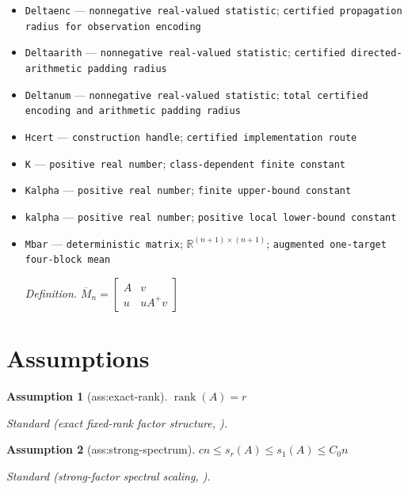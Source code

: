 \documentclass{article}
\newtheorem{assumption}{Assumption}
\begin{document}
\begin{itemize}
  \item \texttt{Deltaenc} --- \texttt{nonnegative real-\allowbreak{}valued statistic}; \texttt{certified propagation radius for observation encoding}
  \item \texttt{Deltaarith} --- \texttt{nonnegative real-\allowbreak{}valued statistic}; \texttt{certified directed-\allowbreak{}arithmetic padding radius}
  \item \texttt{Deltanum} --- \texttt{nonnegative real-\allowbreak{}valued statistic}; \texttt{total certified encoding and arithmetic padding radius}
  \item \texttt{Hcert} --- \texttt{construction handle}; \texttt{certified implementation route}
  \item \texttt{K} --- \texttt{positive real number}; \texttt{class-\allowbreak{}dependent finite constant}
  \item \texttt{Kalpha} --- \texttt{positive real number}; \texttt{finite upper-\allowbreak{}bound constant}
  \item \texttt{kalpha} --- \texttt{positive real number}; \texttt{positive local lower-\allowbreak{}bound constant}
  \item \texttt{Mbar} --- \texttt{deterministic matrix}; \(\mathbb R^{(n+1)\times(n+1)}\); \texttt{augmented one-\allowbreak{}target four-\allowbreak{}block mean}
  \par\smallskip\noindent\emph{Definition.} \(\overline M_n=\begin{bmatrix}A&v\\u&uA^+v\end{bmatrix}\)
\end{itemize}

\section{Assumptions}

\begin{assumption}[ass:exact-rank]\label{ass:exact-rank}
\(\operatorname{rank}(A)=r\)
\par\smallskip\noindent\emph{Standard} (exact fixed-rank factor structure, \cite{YanWainwright2024}).
\end{assumption}

\begin{assumption}[ass:strong-spectrum]\label{ass:strong-spectrum}
\(cn\le s_r(A)\le s_1(A)\le C_0n\)
\par\smallskip\noindent\emph{Standard} (strong-factor spectral scaling, \cite{YanWainwright2024}).
\end{assumption}
\end{document}
